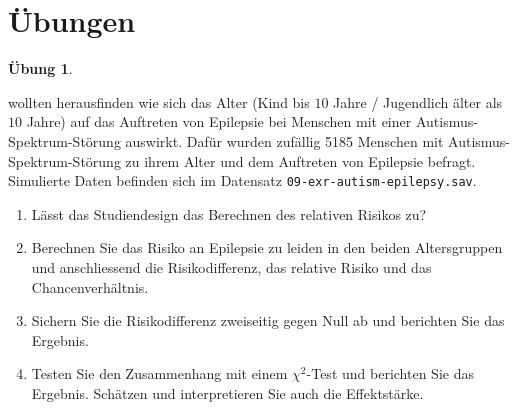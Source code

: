\documentclass[
]{book}
\providecommand{\tightlist}{%
  \setlength{\itemsep}{0pt}\setlength{\parskip}{0pt}}
\theoremstyle{definition}
\theoremstyle{definition}
\theoremstyle{definition}
\newtheorem{exercise}{Übung}[chapter]
\theoremstyle{definition}
\theoremstyle{remark}
\begin{document}
\section{Übungen}\label{uxfcbungen-6}

\begin{exercise}
\protect\hypertarget{exr:autism-epilepsy}{}\label{exr:autism-epilepsy}\leavevmode

\citet{viscidi2013} wollten herausfinden wie sich das Alter (Kind bis \(10\)
Jahre / Jugendlich älter als \(10\) Jahre) auf das Auftreten von Epilepsie
bei Menschen mit einer Autismus-Spektrum-Störung auswirkt. Dafür wurden
zufällig 5185 Menschen mit
Autismus-Spektrum-Störung zu ihrem Alter und dem Auftreten von Epilepsie
befragt. Simulierte Daten befinden sich im Datensatz
\texttt{09-exr-autism-epilepsy.sav}.

\begin{enumerate}
\def\labelenumi{\alph{enumi})}
\tightlist
\item
  Lässt das Studiendesign das Berechnen des relativen Risikos zu?
\item
  Berechnen Sie das Risiko an Epilepsie zu leiden in den beiden Altersgruppen und anschliessend die Risikodifferenz, das relative Risiko und das Chancenverhältnis.
\item
  Sichern Sie die Risikodifferenz zweiseitig gegen Null ab und
  berichten Sie das Ergebnis.
\item
  Testen Sie den Zusammenhang mit einem \(\chi^2\)-Test und berichten
  Sie das Ergebnis. Schätzen und interpretieren Sie auch die Effektstärke.
\end{enumerate}

\end{exercise}
\end{document}

